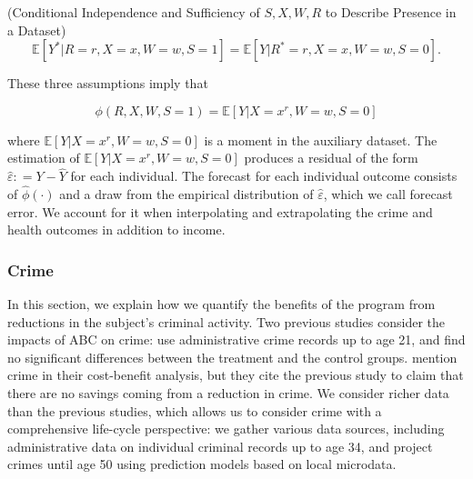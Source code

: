 \begin{assumption} (Conditional Independence and Sufficiency of $S, X, W, R$ to Describe Presence in a Dataset)
\begin{equation}
\mathbb{E} \left[ Y^* | R = r, X = x, W = w, S = 1 \right] = \mathbb{E} \left[ Y | R^* = r , X = x, W = w, S = 0\right]. 
\end{equation}
\end{assumption}

\noindent These three assumptions imply that 

\begin{equation}
\phi \left( R, X, W, S = 1 \right) = \mathbb{E} \left[ Y | X = x^r, W = w, S = 0 \right]  
\end{equation}

\noindent where $\mathbb{E} \left[ Y | X = x^r, W = w, S = 0 \right]$ is a moment in the auxiliary dataset. The estimation of $\mathbb{E} \left[ Y | X = x^r, W = w, S = 0 \right]$ produces a residual of the form $\widehat{\varepsilon} : = Y - \widehat{Y}$ for each individual. The forecast for each  individual outcome consists of $\widehat{\phi} \left( \cdot \right)$ and a draw from the empirical distribution of $\widehat{\varepsilon}$, which we call forecast error. We account for it when interpolating and extrapolating the crime and health outcomes in addition to income.

\subsubsection{Crime}  \label{sec:crime}

\noindent In this section, we explain how we quantify the benefits of the program from reductions in the subject's criminal activity. Two previous studies consider the impacts of ABC on crime: \citet{Clarke_Campbell_1998_ABC_Comparison_ECRQ} use administrative crime records up to age 21, and find no significant differences between the treatment and the control groups. \cite{Barnett_Masse_2007_EER} mention crime in their cost-benefit analysis, but they cite the previous study to claim that there are no savings coming from a reduction in crime. We consider richer data than the previous studies, which allows us to consider crime with a comprehensive life-cycle perspective: we gather various data sources, including administrative data on individual criminal records up to age 34, and project crimes until age 50 using prediction models based on local microdata. \\

